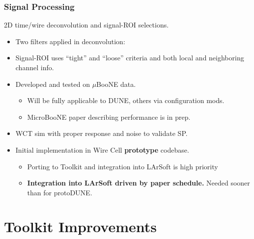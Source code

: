 \documentclass[xcolor=dvipsnames]{beamer}
\begin{document}
\begin{frame}
  \frametitle{Signal Processing}
  2D time/wire deconvolution and signal-ROI selections.
  \begin{itemize}
  \item Two filters applied in deconvolution:
  \item Signal-ROI uses ``tight'' and ``loose'' criteria and both
    local and neighboring channel info.
  \item Developed and tested on $\mu$BooNE data.
    \begin{itemize}\footnotesize
    \item Will be fully applicable to DUNE, others via configuration mods.
    \item MicroBooNE paper describing performance is in prep.
    \end{itemize}
  \item WCT sim with proper response and noise to validate SP.
  \item Initial implementation in Wire Cell \textbf{prototype} codebase.
    \begin{itemize}\footnotesize
    \item Porting to Toolkit and integration into LArSoft is high priority
    \item \textbf{Integration into LArSoft driven by paper schedule.}
      Needed sooner than for protoDUNE.
    \end{itemize}
  \end{itemize}
\end{frame}

\section{Toolkit Improvements}
\end{document}
